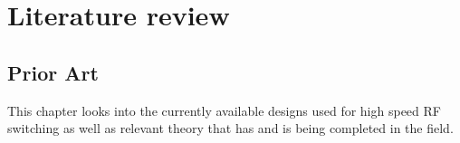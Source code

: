 \documentclass[12pt,openany,a4paper]{book}
\begin{document}













\chapter{Literature review}
\section{Prior Art}
This chapter looks into the currently available designs used for high speed RF switching as well as relevant theory that has and is being completed in the field.


\end{document}
